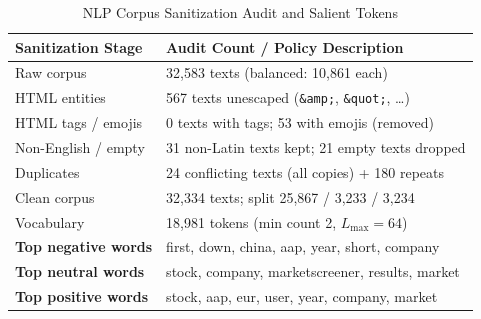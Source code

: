 \documentclass[10pt,journal]{IEEEtran}
\begin{document}
\begin{table}[htbp]
\centering
\caption{NLP Corpus Sanitization Audit and Salient Tokens}
\label{tab:nlp_prep}
\begin{tabular}{ll}
\toprule
\textbf{Sanitization Stage} & \textbf{Audit Count / Policy Description} \\
\midrule
Raw corpus               & 32,583 texts (balanced: 10,861 each) \\
HTML entities            & 567 texts unescaped (\texttt{\&amp;}, \texttt{\&quot;}, \ldots) \\
HTML tags / emojis       & 0 texts with tags; 53 with emojis (removed) \\
Non-English / empty      & 31 non-Latin texts kept; 21 empty texts dropped \\
Duplicates               & 24 conflicting texts (all copies) + 180 repeats \\
Clean corpus             & 32,334 texts; split 25,867 / 3,233 / 3,234 \\
Vocabulary               & 18,981 tokens (min count 2, $L_{\text{max}} = 64$) \\
\midrule
\textbf{Top negative words} & first, down, china, aap, year, short, company \\
\textbf{Top neutral words}  & stock, company, marketscreener, results, market \\
\textbf{Top positive words} & stock, aap, eur, user, year, company, market \\
\bottomrule
\end{tabular}
\end{table}
\end{document}
